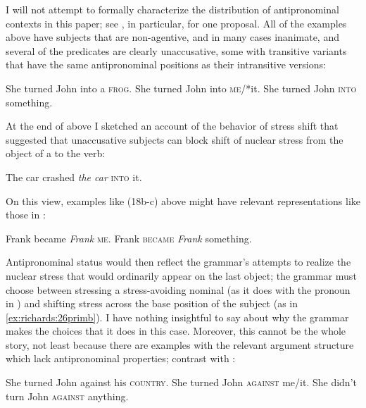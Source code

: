 \documentclass[output=paper]{LSP/langsci}
\begin{document}
  I will not attempt to formally characterize the distribution of antipronominal contexts in this paper; see \citet{Stanton2016}, in particular, for one proposal.  All of the examples above have subjects that are non-agentive, and in many cases inanimate, and several of the predicates are clearly unaccusative, some with transitive variants that have the same antipronominal positions as their intransitive versions:


\ea%
    \label{ex:richards:24prim} %
\ea She turned John into a \textsc{frog}.
\ex She turned John into \textsc{me}/*it.
\ex She turned John \textsc{into} something.
\z
\z

At the end of  above I sketched an account of the behavior of stress shift that suggested that unaccusative subjects can block shift of nuclear stress from the object of a  to the verb:


\ea%
    \label{ex:richards:25prim}
    
  The car {\textbar} crashed {\textbar}\textit{the car}{\textbar} \textsc{into} it.{\textbar}
\z

On this view, examples like (18b-c) above might have relevant representations like those in :


\ea%
    \label{ex:richards:26prim}
  \ea  \label{ex:richards:26prima} Frank {\textbar} became {\textbar} \textit{Frank} {\textbar} \textsc{me}. {\textbar}
\ex   \label{ex:richards:26primb} Frank {\textbar} \textsc{became} {\textbar} \textit{Frank} {\textbar} something. {\textbar}
\z
\z

Antipronominal status would then reflect the grammar's attempts to realize the nuclear stress that would ordinarily appear on the last object; the grammar must choose between stressing a stress-avoiding nominal (as it does with the pronoun in ) and shifting stress across the base position of the subject (as in \ref{ex:richards:26primb}).  I have nothing insightful to say about why the grammar makes the choices that it does in this case.  Moreover, this cannot be the whole story, not least because there are examples with the relevant argument structure which lack antipronominal properties; contrast  with :


\ea%
    \label{ex:richards:27prim}
  \ea She turned John against his \textsc{country}.
\ex She turned John \textsc{against} me/it.
\ex She didn't turn John \textsc{against} anything.
\z
\z
\end{document}
